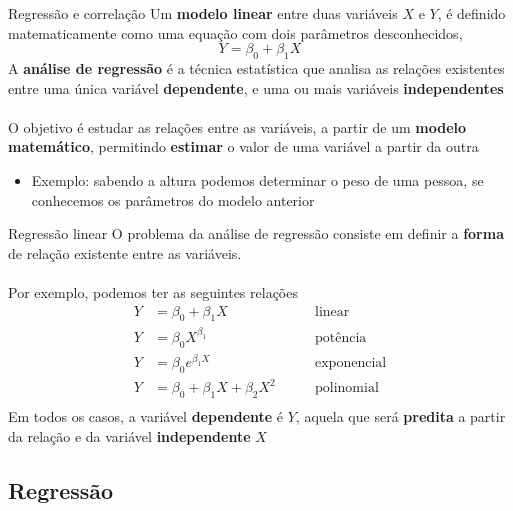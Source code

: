 \documentclass[10pt]{beamer}\usepackage[]{graphicx}\usepackage[]{color}
\theoremstyle{definition}
\begin{document}
\begin{frame}[fragile]{Regressão e correlação}
  Um \textbf{modelo linear} entre duas variáveis $X$ e $Y$, é definido
  matematicamente como uma equação com dois parâmetros desconhecidos,
  \begin{equation*}
    Y = \beta_0 + \beta_1 X
  \end{equation*}
  A \textbf{análise de regressão} é a técnica estatística que analisa as
  relações existentes entre uma única variável \textbf{dependente}, e
  uma ou mais variáveis \textbf{independentes} \\~\\
  O objetivo é estudar as relações entre as variáveis, a partir de um
  \textbf{modelo matemático}, permitindo \textbf{estimar} o valor de uma
  variável a partir da outra
  \begin{itemize}
  \item Exemplo: sabendo a altura podemos determinar o peso de uma
    pessoa, se conhecemos os parâmetros do modelo anterior
  \end{itemize}
\end{frame}

\begin{frame}[fragile]{Regressão linear}
  O problema da análise de regressão consiste em definir a
  \textbf{forma} de relação existente entre as variáveis. \\~\\
  Por exemplo, podemos ter as seguintes relações
  \begin{align*}
    Y &= \beta_0 + \beta_1 X &\qquad \text{linear} \\
    Y &= \beta_0 X^{\beta_1} &\qquad \text{potência} \\
    Y &= \beta_0 e^{\beta_1 X} &\qquad \text{exponencial} \\
    Y &= \beta_0 + \beta_1 X + \beta_2 X^2 &\qquad \text{polinomial} \\
  \end{align*}
  Em todos os casos, a variável \textbf{dependente} é $Y$, aquela que
  será \textbf{predita} a partir da relação e da variável
  \textbf{independente} $X$
\end{frame}

\subsection{Regressão}
\end{document}
